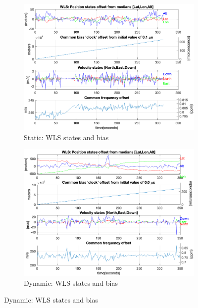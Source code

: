         \begin{figure}[h!]
            \centering
            \begin{subfigure}{0.23\textwidth}
                \includegraphics[width=\textwidth]{images/tests/Monte_Cappuccini/png/Samsung_A51_Monte_Cappuccini_fig5.png}
                \caption{Static: WLS states and bias}
            \end{subfigure}
            \hfill
            \begin{subfigure}{0.23\textwidth}
                \includegraphics[width=\textwidth]{images/tests/Tram_15_trip_Castello_to_Pescatore/filtered/Samsung_A51_Tram_15_trip_Castello_to_Pescatore_fig5.png}
                \caption{Dynamic: WLS states and bias}
            \end{subfigure}
        \end{figure}
    
